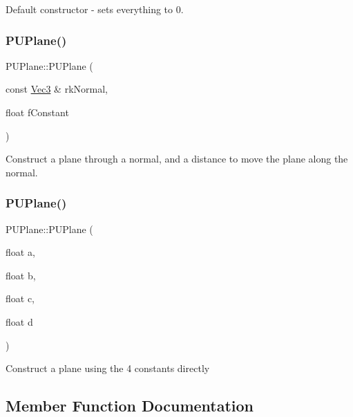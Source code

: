 Default constructor -\/ sets everything to 0. \mbox{\label{classPUPlane_a58477f1c39a22c2c6feddb85c1559544}} 
\subsubsection{\texorpdfstring{P\+U\+Plane()}{PUPlane()}\hspace{0.1cm}{\footnotesize\ttfamily [5/6]}}
{\footnotesize\ttfamily P\+U\+Plane\+::\+P\+U\+Plane (\begin{DoxyParamCaption}\item[{const \hyperlink{classVec3}{Vec3} \&}]{rk\+Normal,  }\item[{float}]{f\+Constant }\end{DoxyParamCaption})}

Construct a plane through a normal, and a distance to move the plane along the normal. \mbox{\label{classPUPlane_af65211380d976874fee10f0ed0122535}} 
\subsubsection{\texorpdfstring{P\+U\+Plane()}{PUPlane()}\hspace{0.1cm}{\footnotesize\ttfamily [6/6]}}
{\footnotesize\ttfamily P\+U\+Plane\+::\+P\+U\+Plane (\begin{DoxyParamCaption}\item[{float}]{a,  }\item[{float}]{b,  }\item[{float}]{c,  }\item[{float}]{d }\end{DoxyParamCaption})}

Construct a plane using the 4 constants directly 

\subsection{Member Function Documentation}
\mbox{\label{classPUPlane_a8d46bb12b79dfa18db08e2a59776191e}} 

